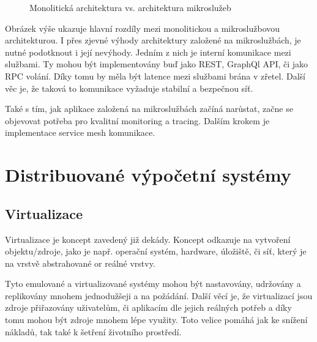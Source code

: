 \documentclass[thesis=M,czech]{FITthesis}[2019/12/23]
\theoremstyle{plain}
\theoremstyle{definition}
\begin{document}

\begin{figure}[H]\centering
	

	\caption[Monolitická architektura vs. architektura mikroslužeb]{Monolitická architektura vs. architektura mikroslužeb}\label{fig:float}
\end{figure}


Obrázek výše ukazuje hlavní rozdíly mezi monolitickou a mikroslužbovou architekturou. I přes zjevné výhody architektury založené na mikroslužbách, je nutné podotknout i její nevýhody. Jedním z nich je interní komunikace mezi službami. Ty mohou být implementovány buď jako REST, GraphQl API, či jako RPC volání. Díky tomu by měla být latence mezi službami brána v zřetel. Další věc je, že taková to komunikace vyžaduje stabilní a bezpečnou síť.

Také s tím, jak aplikace založená na mikroslužbách začíná narůstat, začne se objevovat potřeba pro kvalitní monitoring a tracing. Dalším krokem je implementace service mesh komunikace.



\section{Distribuované výpočetní systémy}



\subsection{Virtualizace}

Virtualizace je koncept zavedený již dekády. Koncept odkazuje na vytvoření objektu/zdroje, jako je např. operační systém, hardware, úložiště, či síť, který je na vrstvě abstrahované or reálné vrstvy.

Tyto emulované a virtualizované systémy mohou být nastavovány, udržovány a replikovány mnohem jednodužšeji a na požádání. Další věcí je, že virtualizací jsou zdroje přiřazovány uživatelům, či aplikacím dle jejich reálných potřeb a díky tomu mohou být zdroje mnohem lépe využity. Toto velice pomáhá jak ke snížení nákladů, tak také k šetření životního prostředí. 
\end{document}
